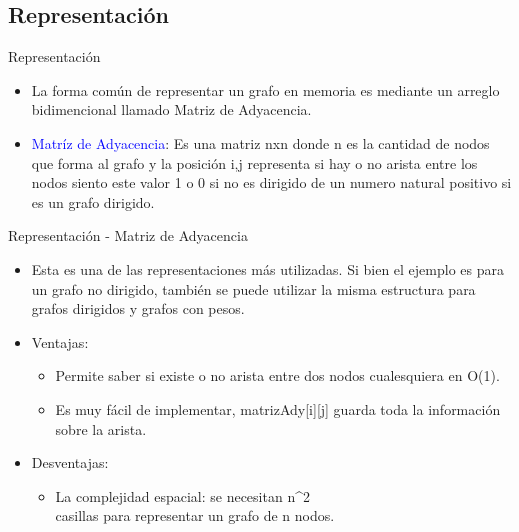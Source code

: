 \documentclass[handout]{beamer} %
\newcommand{\blue}[1]{\textcolor{blue}{#1}}
\begin{document}
\subsection{Representación}
\begin{frame}{Representación}
  \begin{itemize}
    \item La forma común de representar un grafo en memoria es mediante un arreglo bidimencional llamado Matriz de Adyacencia.
      \item \blue{Matríz de Adyacencia}: Es una matriz nxn donde n es la cantidad de nodos que forma al grafo y la posición i,j representa si hay o no arista entre los nodos siento este valor 1 o 0 si no es dirigido de un numero natural positivo si es un grafo dirigido.
  \end{itemize}
\end{frame}

\begin{frame}{Representación - Matriz de Adyacencia}
  \begin{itemize}
    \item Esta es una de las representaciones más utilizadas. Si bien el ejemplo
es para un grafo no dirigido, también se puede utilizar la misma
estructura para grafos dirigidos y grafos con pesos.
\item Ventajas:
  \begin{itemize}
    \item Permite saber si existe o no arista entre dos nodos cualesquiera en O(1).
    \item Es muy fácil de implementar, matrizAdy[i][j] guarda toda la información sobre la arista.
  \end{itemize}
\item Desventajas:
  \begin{itemize}
    \item La complejidad espacial: se necesitan {n^{2}} \\ casillas para representar un grafo de n nodos.
  \end{itemize}
\end{itemize}

\end{frame}
\end{document}
